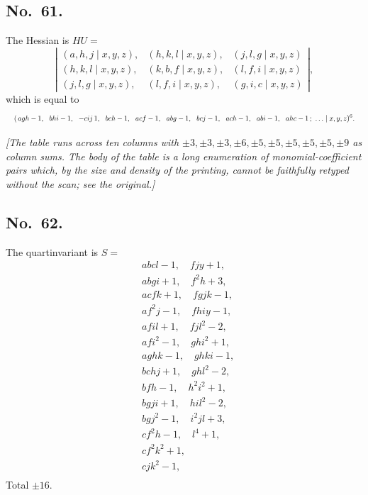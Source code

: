 \documentclass[11pt]{article}
\begin{document}
\subsection*{No.\ 61.}
The Hessian is $HU =$
\[
\left|\begin{array}{ccc}
(a, h, j \mid x, y, z), & (h, k, l \mid x, y, z), & (j, l, g \mid x, y, z) \\
(h, k, l \mid x, y, z), & (k, b, f \mid x, y, z), & (l, f, i \mid x, y, z) \\
(j, l, g \mid x, y, z), & (l, f, i \mid x, y, z), & (g, i, c \mid x, y, z)
\end{array}\right|,
\]
which is equal to
\[ \resizebox{\textwidth}{!}{$\displaystyle
(\,agh - 1,\ \ bhi - 1,\ \ -cij\,1,\ \ bch - 1,\ \ acf - 1,\ \ abg - 1,\ \ bcj - 1,\ \ ach - 1,\ \ abi - 1,\ \ ahc - 1\,;\ \ldots \mid x, y, z)^6.
$} \]

\textit{[The table runs across ten columns with $\pm 3, \pm 3, \pm 3, \pm 6, \pm 5, \pm 5, \pm 5, \pm 5, \pm 5, \pm 9$ as column sums. The body of the table is a long enumeration of monomial-coefficient pairs which, by the size and density of the printing, cannot be faithfully retyped without the scan; see the original.]}

\subsection*{No.\ 62.}
The quartinvariant is $S =$
\begin{align*}
& abcl - 1,\quad fjy + 1, \\
& abgi + 1,\quad f^2 h + 3, \\
& acfk + 1,\quad fgjk - 1, \\
& af^2 j - 1,\quad fhi y - 1, \\
& afil + 1,\quad fjl^2 - 2, \\
& af i^2 - 1,\quad g hi^2 + 1, \\
& aghk - 1,\quad ghki - 1, \\
& bchj + 1,\quad ghl^2 - 2, \\
& bfh - 1,\quad h^2 i^2 + 1, \\
& bgji + 1,\quad hil^2 - 2, \\
& bgj^2 - 1,\quad i^2 jl + 3, \\
& cf^2 h - 1,\quad l^4 + 1, \\
& cf^2 k^2 + 1, \\
& cjk^2 - 1, \\
\end{align*}
Total $\pm 16$.
\end{document}
